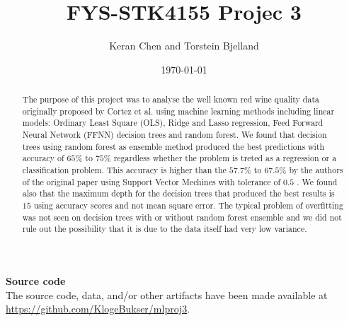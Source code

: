 \documentclass[english,notitlepage,reprint,nofootinbib]{revtex4-1}
\begin{document}
\title{FYS-STK4155 Projec 3}  %
\author{Keran Chen and Torstein Bjelland} %
\date{\today}                             %
\noaffiliation                            %

\begin{abstract}
	The purpose of this project was to analyse the well known red wine quality data originally proposed by Cortez et al. \cite{CORTEZ2009547} using machine learning methods including linear models: Ordinary Least Square (OLS), Ridge and Lasso regression, Feed Forward Neural Network (FFNN) decision trees and random forest. We found that decision trees using random forest as ensemble method produced the best predictions with accuracy of $ 65\% $ to $ 75\% $ regardless whether the problem is treted as a regression or a classification problem. This accuracy is higher than the $ 57.7\% $ to $ 67.5\% $ by the authors of the original paper using Support Vector Mechines with tolerance of $ 0.5 $ . We found also that the maximum depth for the decision trees that produced the best results is $ 15 $ using accuracy scores and not mean square error. The typical problem of overfitting was not seen on decision trees with or without random forest ensemble and we did not rule out the possibility that it is due to the data itself had very low variance. 
\end{abstract}

\maketitle

\begingroup\small\noindent\raggedright\textbf{Source code}\\
The source code, data, and/or other artifacts have been made available at \url{https://github.com/KlogeBukser/mlproj3}.
\endgroup

\end{document}
